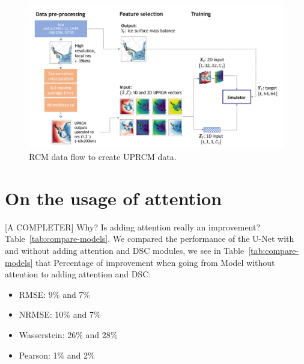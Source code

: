 \documentclass[a4paper,11pt,oneside]{report}
\begin{document}
\begin{figure}[!htb]
  \centering
  \includegraphics[width=\columnwidth]{images/data-flow.pdf}
  \caption []{\small RCM data flow to create UPRCM data.}
  \vspace{-3mm}
  \label{fig:training-data-flow}
\end{figure}

\section{On the usage of attention}
[A COMPLETER] Why? Is adding attention really an improvement? Table~\ref{tab:compare-models}. We compared the performance of the U-Net with and without adding attention and DSC modules, we see in Table~\ref{tab:compare-models} that 
Percentage of improvement when going from Model without attention to adding attention and DSC:
\begin{itemize}
    \item RMSE: 9\% and 7\%
    \item NRMSE: 10\% and 7\%
    \item Wasserstein: 26\% and 28\%
    \item Pearson: 1\% and 2\% 
\end{itemize}

\newpage
\begin{landscape}

\end{landscape}
\end{document}
